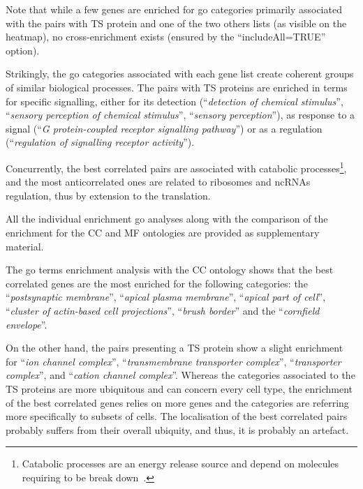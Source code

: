 Note that while a few genes are enriched for \gls{go} categories primarily
associated with the pairs with \gls{TS} protein and one of the two others lists
(as visible on the heatmap),
no cross-enrichment exists
(ensured by the \enquote{\textsf{includeAll=TRUE}} option).\\
\vspace{-\baselineskip}

Strikingly, the \gls{go} categories associated with each gene list create
coherent groups of similar biological processes.
The pairs with \gls{TS} proteins are enriched in terms for specific signalling,
either for its detection (\enquote{\textit{detection of chemical stimulus}},
\enquote{\textit{sensory perception of chemical stimulus}},
\enquote{\textit{sensory perception}}),
as response to a signal (\enquote{\textit{G protein-coupled receptor signalling pathway}})
or as a regulation (\enquote{\textit{regulation of signalling receptor activity}}).

Concurrently, the best correlated pairs are associated with catabolic processes\footnote{%
Catabolic processes are an energy release source
and depend on molecules requiring to be break down~.},
and the most anticorrelated ones are related to
ribosomes and \glspl{ncRNA} regulation,
thus by extension to the translation.

All the individual enrichment \gls{go} analyses
along with the comparison of the enrichment for the CC and MF ontologies
are provided as supplementary material.

The \gls{go} terms enrichment analysis with the CC ontology shows
that the best correlated genes are the most enriched
for the following categories:
the \enquote{\textit{postsynaptic membrane}},
\enquote{\textit{apical plasma membrane}},
\enquote{\textit{apical part of cell}},
\enquote{\textit{cluster of actin-based cell projections}},
\enquote{\textit{brush border}}
and the \enquote{\textit{cornfield envelope}}.\mybr\

On the other hand, the pairs presenting a \gls{TS} protein
show a slight enrichment for
\enquote{\textit{ion channel complex}},
\enquote{\textit{transmembrane transporter complex}},
\enquote{\textit{transporter complex}},
and \enquote{\textit{cation channel complex}}.
Whereas the categories associated to the \gls{TS} proteins
are more ubiquitous and can concern every cell type,
the enrichment of the best correlated genes relies on more genes and
the categories are referring more specifically to subsets of cells.
The localisation of the best correlated pairs probably suffers
from their overall ubiquity,
and thus, it is probably an artefact.

